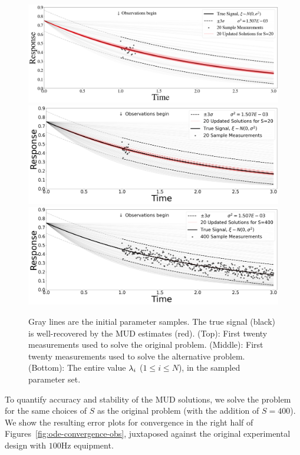 \begin{figure}[htbp]
  \includegraphics[width=\linewidth]{figures/ode/ode_20_reference_solution}
  \includegraphics[width=\linewidth]{figures/ode/ode-alt_20_reference_solution}
  \includegraphics[width=\linewidth]{figures/ode/ode-alt_400_reference_solution}
  \caption{Gray lines are the initial parameter samples.
  The true signal (black) is well-recovered by the MUD estimates (red).
  (Top): First twenty measurements used to solve the original problem.
  (Middle): First twenty measurements used to solve the alternative problem.
  (Bottom): The entire value $\lambda_i$ ($1\leq i \leq N$), in the sampled parameter set.
  }
  \label{fig:ode-alt-reference}
\end{figure}

To quantify accuracy and stability of the MUD solutions, we solve the problem for the same choices of $S$ as the original problem (with the addition of $S=400$).
We show the resulting error plots for convergence in the right half of Figures~\ref{fig:ode-convergence-obs}, juxtaposed against the original experimental design with $100$Hz equipment.


